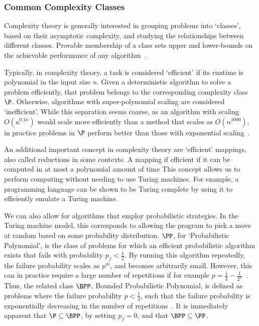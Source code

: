 \subsubsection*{Common Complexity Classes}
Complexity theory is generally interested in grouping problems into `classes', based on their asymptotic complexity, and studying the relationships between different classes. Provable membership of a class sets upper and lower-bounds on the achievable performance of any algorithm~\cite{Nielsen2000}.\par
Typically, in complexity theory, a task is considered `efficient' if its runtime is polynomial in the input size $n$. Given a deterministic algorithm to solve a problem efficiently, that problem belongs to the corresponding complexity class $\P$. Otherwise, algorithms with super-polynomial  scaling are considered `inefficient'. While this separation seems coarse, as an algorithm with scaling $O\left(a^{0.1n}\right)$ would scale more efficiently than a method that scales as $O(n^{1000})$, in practice problems in $\P$ perform better than those with exponential scaling~\cite{Nielsen2000}.\par
An additional important concept in complexity theory are `efficient' mappings, also called reductions in some contexts. A mapping if efficient if it can be computed in at most a polynomial amount of time This concept allows us to perform computing without needing to use Turing machines. For example, a programming language can be shown to be Turing complete by using it to efficiently emulate a Turing machine.\par
We can also allow for algorithms that employ probabilistic strategies. In the Turing machine model, this corresponds to allowing the program to pick a move at random based on some probability distribution. $\PP$, for `Probabilistic Polynomial', is the class of problems for which an efficient probabilistic algorithm exists that fails with probability $p_{f}<\frac{1}{2}$. By running this algorithm repeatedly, the failure probability scales as $p^{m}$, and becomes arbitrarily small. However, this can in practice require a large number of repetitions if for example $p=\frac{1}{2}-\frac{1}{2^{n}}$~\cite{Aaronson2004c}. Thus, the related class $\BPP$, Bounded Probabilistic Polynomial, is defined as problems where the failure probability $p < \frac{1}{3}$, such that the failure probability is exponentially decreasing in the number of repetitions~\cite{Nielsen2000}. It is immediately apparent that $\P\subseteq \BPP$, by setting $p_{f}=0$, and that $\BPP\subseteq \PP$.\par
